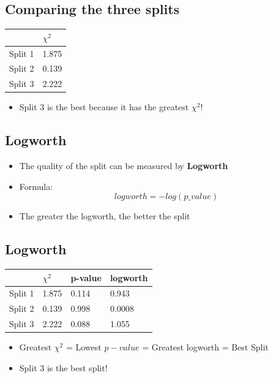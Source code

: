 \documentclass[
]{article}
\providecommand{\tightlist}{%
  \setlength{\itemsep}{0pt}\setlength{\parskip}{0pt}}
\begin{document}
\hypertarget{comparing-the-three-splits}{%
\subsection{Comparing the three
splits}\label{comparing-the-three-splits}}

\begin{longtable}[]{@{}ll@{}}
\toprule
& \(\chi^2\) \\
\midrule
\endhead
Split 1 & 1.875 \\
Split 2 & 0.139 \\
Split 3 & 2.222 \\
\bottomrule
\end{longtable}

\begin{itemize}
\tightlist
\item
  Split 3 is the best because it has the greatest \(\chi^2\)!
\end{itemize}

\hypertarget{logworth}{%
\subsection{Logworth}\label{logworth}}

\begin{itemize}
\tightlist
\item
  The quality of the split can be measured by \textbf{Logworth}
\item
  Formula: \[logworth = -log(p\text{_}value)\]
\item
  The greater the logworth, the better the split
\end{itemize}

\hypertarget{logworth-1}{%
\subsection{Logworth}\label{logworth-1}}

\begin{longtable}[]{@{}llll@{}}
\toprule
& \(\chi^2\) & p-value & logworth \\
\midrule
\endhead
Split 1 & 1.875 & 0.114 & 0.943 \\
Split 2 & 0.139 & 0.998 & 0.0008 \\
Split 3 & 2.222 & 0.088 & 1.055 \\
\bottomrule
\end{longtable}

\begin{itemize}
\item
  Greatest \(\chi^2\) = Lowest \(p-value\) = Greatest logworth = Best
  Split
\item
  Split 3 is the best split!
\end{itemize}
\end{document}
